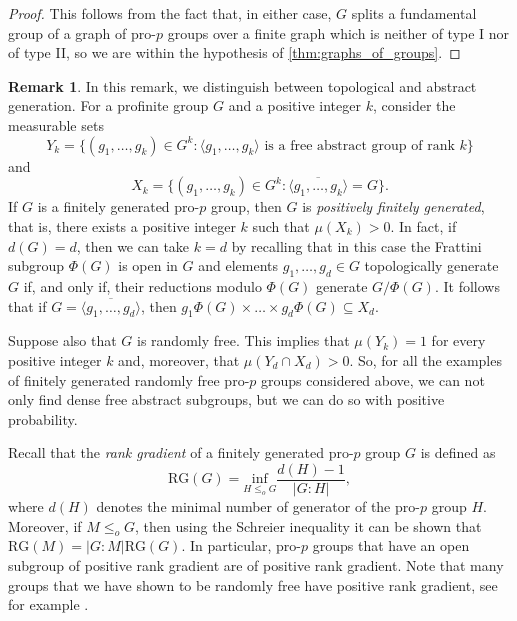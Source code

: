 \documentclass[a4paper,10pt]{amsart}
\theoremstyle{plain}
\theoremstyle{definition}
\newtheorem{remark}[thm]{Remark}
\numberwithin{equation}{section}
\begin{document}
\begin{proof}
    This follows from the fact that, in either case, $G$ splits a fundamental group of a graph of pro-$p$ groups over a finite graph which is neither of type I nor of type II, so we are within the hypothesis of \cref{thm:graphs_of_groups}.
\end{proof}

\begin{remark}
    In this remark, we distinguish between topological and abstract generation. For a profinite group $G$ and a positive integer $k$, consider the measurable sets
    \[Y_k = \{(g_1,\ldots,g_k) \in G^k : \langle g_1,\ldots,g_k \rangle \text{ is a free abstract group of rank $k$}\}\]
    and
    \[X_k = \{(g_1,\ldots,g_k) \in G^k : \overline{\langle g_1,\ldots,g_k \rangle} = G \}.\]
    If $G$ is a finitely generated pro-$p$ group, then $G$ is \emph{positively finitely generated}, that is, there exists a positive integer $k$ such that $\mu(X_k)>0$. In fact, if $d(G) = d$, then we can take $k=d$ by recalling that in this case the Frattini subgroup $\Phi(G)$ is open in $G$ and elements $g_1,\ldots,g_d \in G$ topologically generate $G$ if, and only if, their reductions modulo $\Phi(G)$ generate $G/\Phi(G)$. It follows that if $G = \overline{\langle g_1,\ldots,g_d\rangle}$, then $g_1 \Phi(G) \times \ldots \times g_d \Phi(G) \subseteq X_d$.
    
    Suppose also that $G$ is randomly free. This implies that $\mu(Y_k) = 1$ for every positive integer $k$ and, moreover, that $\mu(Y_d \cap X_d) > 0$. So, for all the examples of finitely generated randomly free pro-$p$ groups considered above, we can not only find dense free abstract subgroups, but we can do so with positive probability.
\end{remark}

   Recall that the \emph{rank gradient} of a finitely generated pro-$p$ group $G$ is defined as
	\begin{equation*}
		\mathrm{RG}(G)=\underset{H\leq_oG}{\mathrm{inf}}\frac{d(H)-1}{|G:H|},
	\end{equation*}
	where $d(H)$ denotes the minimal number of generator of the pro-$p$ group $H$. Moreover, if $M\leq_oG$, then using the Schreier inequality it can be shown that $\mathrm{RG}(M)=|G:M|\mathrm{RG}(G)$. In particular, pro-$p$ groups that have an open subgroup of positive rank gradient are of positive rank gradient. Note that many groups that we have shown to be randomly free have positive rank gradient, see for example \cite[Section 1]{GGK19}.
    
\end{document}
